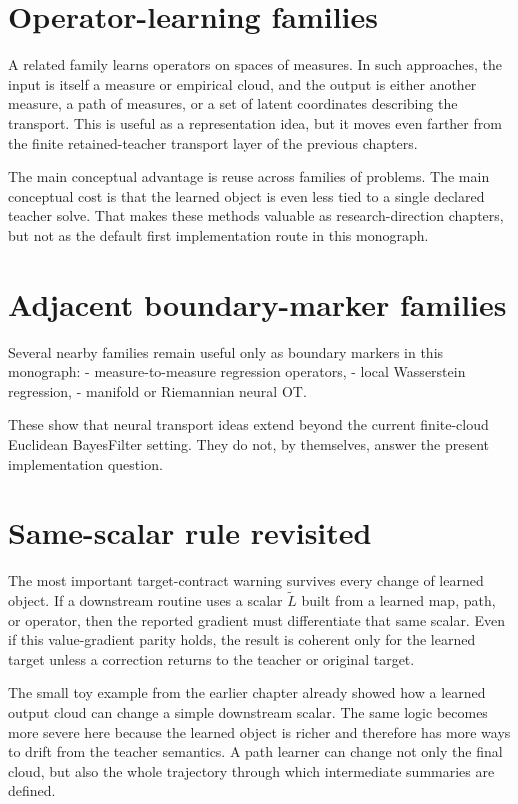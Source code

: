 \section{Operator-learning families}
\label{sec:bf-neural-ot-dynamic-operator}

A related family learns operators on spaces of measures.  In such approaches, the
input is itself a measure or empirical cloud, and the output is either another
measure, a path of measures, or a set of latent coordinates describing the
transport.  This is useful as a representation idea, but it moves even farther
from the finite retained-teacher transport layer of the previous chapters.

The main conceptual advantage is reuse across families of problems.  The main
conceptual cost is that the learned object is even less tied to a single declared
teacher solve.  That makes these methods valuable as research-direction chapters,
but not as the default first implementation route in this monograph.

\section{Adjacent boundary-marker families}
\label{sec:bf-neural-ot-dynamic-boundary-families}

Several nearby families remain useful only as boundary markers in this monograph:
- measure-to-measure regression operators,
- local Wasserstein regression,
- manifold or Riemannian neural OT.

These show that neural transport ideas extend beyond the current finite-cloud
Euclidean BayesFilter setting.  They do not, by themselves, answer the present
implementation question.

\section{Same-scalar rule revisited}
\label{sec:bf-neural-ot-dynamic-same-scalar}

The most important target-contract warning survives every change of learned object.
If a downstream routine uses a scalar \(\widetilde L\) built from a learned map,
path, or operator, then the reported gradient must differentiate that same scalar.
Even if this value-gradient parity holds, the result is coherent only for the
learned target unless a correction returns to the teacher or original target.

The small toy example from the earlier chapter already showed how a learned output
cloud can change a simple downstream scalar.  The same logic becomes more severe
here because the learned object is richer and therefore has more ways to drift from
the teacher semantics.  A path learner can change not only the final cloud, but
also the whole trajectory through which intermediate summaries are defined.

